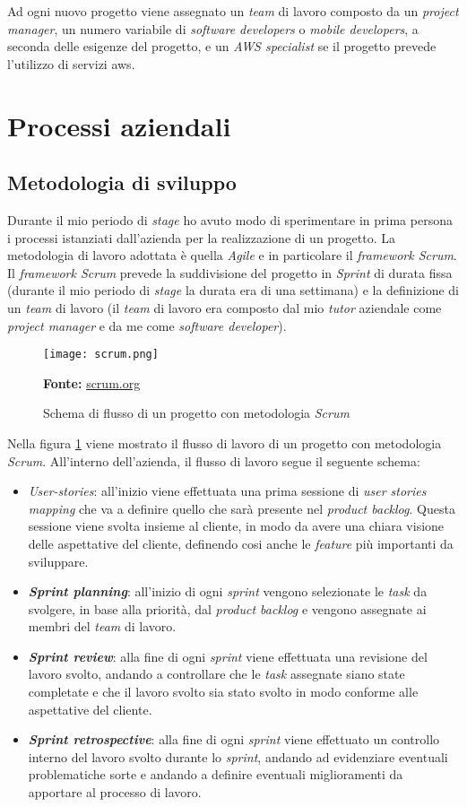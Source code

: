 \noindent
Ad ogni nuovo progetto viene assegnato un \textit{team} di lavoro composto da un \textit{project manager}, un numero variabile di \textit{software developers} o \textit{mobile developers}, a seconda delle esigenze del progetto, e un \textit{AWS specialist} se il progetto prevede l'utilizzo di servizi \gls{aws}. 
\pagebreak
\section{Processi aziendali}
\subsection{Metodologia di sviluppo}
Durante il mio periodo di \textit{stage} ho avuto modo di sperimentare in prima persona i processi istanziati dall'azienda per la realizzazione di un progetto.
La metodologia di lavoro adottata è quella \textit{Agile} e in particolare il \textit{framework Scrum}.\\ 
Il \textit{framework Scrum} prevede la suddivisione del progetto in \textit{Sprint} di durata fissa (durante il mio periodo di \textit{stage} la durata era di una settimana) e la definizione di un \textit{team} di lavoro (il \textit{team} di lavoro era composto dal mio \textit{tutor} aziendale come \textit{project manager} e da me come \textit{software developer}).
\begin{figure}[H]
    \centering
    \texttt{[image: scrum.png]}
    \caption{Schema di flusso di un progetto con metodologia \textit{Scrum}}
    \small \textbf{Fonte:} \url{scrum.org}
    \label{fig:scrum}
\end{figure}
\noindent
Nella figura \ref{fig:scrum} viene mostrato il flusso di lavoro di un progetto con metodologia \textit{Scrum}. All'interno dell'azienda, il flusso di lavoro segue il seguente schema:
\begin{itemize}
    \item \textit{\gls{User-stories}}: all'inizio viene effettuata una prima sessione di \textit{user stories mapping} che va a definire quello che sarà presente nel \textit{product backlog}. Questa sessione viene svolta insieme al cliente, in modo da avere una chiara visione delle aspettative del cliente, definendo cosi anche le \textit{feature} più importanti da sviluppare.
    \item \textbf{\textit{Sprint planning}}: all'inizio di ogni \textit{sprint} vengono selezionate le \textit{task} da svolgere, in base alla priorità, dal \textit{product backlog} e vengono assegnate ai membri del \textit{team} di lavoro.
    \item \textbf{\textit{Sprint review}}: alla fine di ogni \textit{sprint} viene effettuata una revisione del lavoro svolto, andando a controllare che le \textit{task} assegnate siano state completate e che il lavoro svolto sia stato svolto in modo conforme alle aspettative del cliente.
    \item \textbf{\textit{Sprint retrospective}}: alla fine di ogni \textit{sprint} viene effettuato un controllo interno del lavoro svolto durante lo \textit{sprint}, andando ad evidenziare eventuali problematiche sorte e andando a definire eventuali miglioramenti da apportare al processo di lavoro.
\end{itemize}
